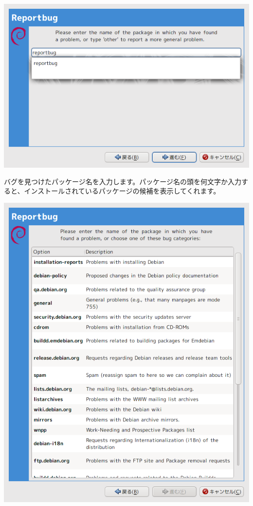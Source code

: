\documentclass[mingoth,a4paper]{jsarticle}
\begin{document}
 \includegraphics[scale=0.5]{image200909/reportbug-2.png}

バグを見つけたパッケージ名を入力します。パッケージ名の頭を何文字か入力す
ると、インストールされているパッケージの候補を表示してくれます。

 \includegraphics[scale=0.5]{image200909/reportbug-8.png}
\end{document}
